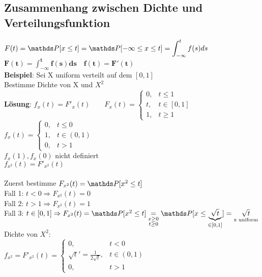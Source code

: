 \subsection{Zusammenhang zwischen Dichte und Verteilungsfunktion}
$F(t) = \PP[x\leq t]=\PP[-\infty \leq x \leq t] = \displaystyle\int_{-\infty}^t f (s) ds$\medskip\\
$\mathbf{F(t) = \displaystyle \int_{-\infty}^t f(s) ds} \quad \mathbf{f(t) = F'(t)}$\medskip\\
\textbf{Beispiel}: Sei X uniform verteilt auf dem $[0,1] $\\
 Bestimme Dichte von X und $X^2$\medskip\\
\textbf{Lösung}: $f_x(t)=F'_x(t) \qquad F_x(t) = \begin{cases}
0, & t \leq 1\\t, & t \in [0,1]\\
1, &t \geq 1
\end{cases}$\medskip\\
$f_x(t) = \begin{cases}
0,&t \leq 0\\
1,&t \in (0,1)\\
0,&t >1
\end{cases}$\medskip\\
$f_x(1), f_x(0)$ nicht definiert
\medskip\\
$f_{x^2}(t) = F'_{x^2}(t)$ \smallskip\\
\smallskip\\
Zuerst bestimme $F_{x^2}(t) = \PP [x^2 \leq t]$\smallskip\\
Fall 1: $t < 0 \Rightarrow F_{x^2}(t) = 0$\smallskip\\
Fall 2: $t > 1 \Rightarrow F_{x^2}(t) = 1$\smallskip\\
Fall 3: $t \in [0,1] \Rightarrow F_{x^2}(t) = \PP [x^2\leq t] \underset{\substack{x \geq 0\\t \geq 0}}{=} \PP [x \leq \underbrace{\sqrt{t}}_{\in [0,1]}] = \underset{\text{x uniform}}{\sqrt{t}}$\medskip\\
Dichte von $X^2$:\medskip\\
$f_{x^2} = F'_{x^2}(t) = \begin{cases}
0, & t<0\\
\sqrt{t}'=\frac{1}{2\sqrt{t}}, & t \in (0,1)\\
0, &t >1
\end{cases}$\smallskip\\
\medskip\\
